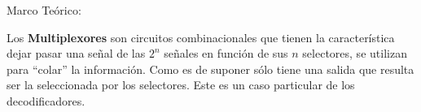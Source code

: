 \documentclass[11pt, letterpaper]{article}
\begin{document}
	\begin{block}{Marco Teórico:\\}
		
		Los \textbf{Multiplexores} son circuitos combinacionales que tienen la característica dejar pasar una señal de las $2^n$ señales en función de sus $n$ selectores, se utilizan para ``colar'' la información. Como es de suponer sólo tiene una salida que resulta ser la seleccionada por los selectores. Este es un caso particular de los decodificadores.
		\newpage
		
		\begin{figure}[H]
		\end{figure}
		
	\end{block}
\end{document}
